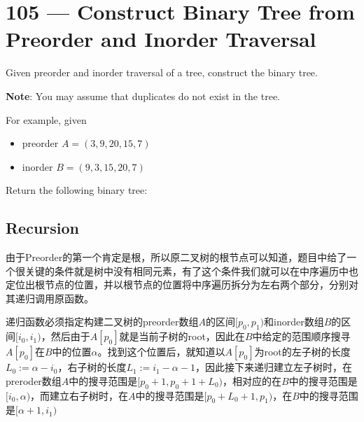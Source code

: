 \section{105 --- Construct Binary Tree from Preorder and Inorder Traversal}\label{105algo}
Given preorder and inorder traversal of a tree, construct the binary tree.
\par
\textbf{Note}: You may assume that duplicates do not exist in the tree.
\par
For example, given
\begin{itemize}
    \item preorder $A = (3,9,20,15,7)$
    \item inorder $B = (9,3,15,20,7)$
\end{itemize}
Return the following binary tree:
\begin{figure}[H]
\end{figure}
\subsection{Recursion}
由于Preorder的第一个肯定是根，所以原二叉树的根节点可以知道，题目中给了一个很关键的条件就是树中没有相同元素，有了这个条件我们就可以在中序遍历中也定位出根节点的位置，并以根节点的位置将中序遍历拆分为左右两个部分，分别对其递归调用原函数。
\par
递归函数必须指定构建二叉树的preorder数组$A$的区间$[p_0, p_1)$和inorder数组$B$的区间$[i_0,i_1)$，然后由于$A[p_0]$就是当前子树的root，因此在$B$中给定的范围顺序搜寻$A[p_0]$在$B$中的位置$\alpha$。找到这个位置后，就知道以$A[p_0]$为root的左子树的长度$L_0:=\alpha - i_0$，右子树的长度$L_1:=i_1 - \alpha - 1$，因此接下来递归建立左子树时，在preroder数组$A$中的搜寻范围是$[p_0+1, p_0+1+L_0)$，相对应的在$B$中的搜寻范围是$[i_0, \alpha)$，而建立右子树时，在$A$中的搜寻范围是$[p_0+L_0+1, p_1)$，在$B$中的搜寻范围是$[\alpha+1, i_1)$
